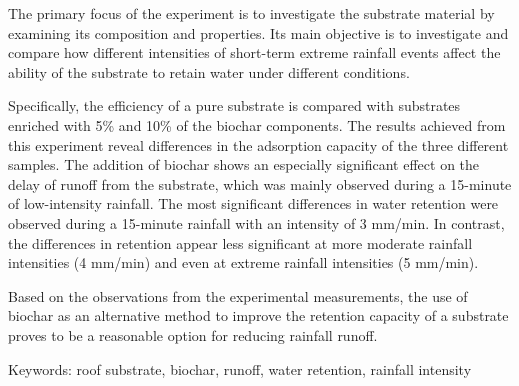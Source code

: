 \noindent

The primary focus of the experiment is to investigate the substrate material by examining its composition and properties. Its main objective is to investigate and compare how different intensities of short-term extreme rainfall events affect the ability of the substrate to retain water under different conditions. 

Specifically, the efficiency of a pure substrate is compared with substrates enriched with 5\% and 10\% of the biochar components. The results achieved from this experiment reveal differences in the adsorption capacity of the three different samples. The addition of biochar shows an especially significant effect on the delay of runoff from the substrate, which was mainly observed during a 15-minute of low-intensity rainfall. The most significant differences in water retention were observed during a 15-minute rainfall with an intensity of 3 mm/min. In contrast, the differences in retention appear less significant at more moderate rainfall intensities (4 mm/min) and even at extreme rainfall intensities (5 mm/min). 

Based on the observations from the experimental measurements, the use of biochar as an alternative method to improve the retention capacity of a substrate proves to be a reasonable option for reducing rainfall runoff.

Keywords: roof substrate, biochar, runoff, water retention, rainfall intensity 



\newpage{}
{}
\begin{flushleft}





\end{flushleft}

